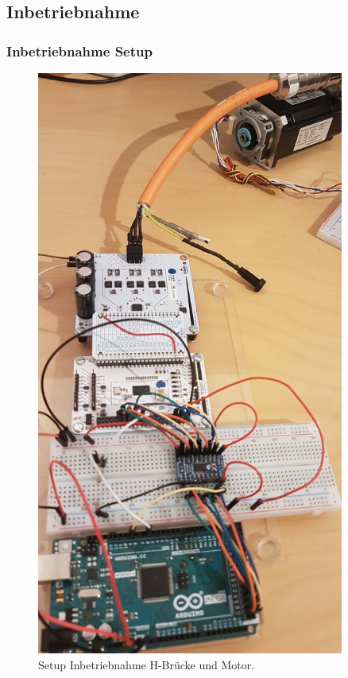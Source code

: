 \begin{appendix}
\subsection{Inbetriebnahme}

\subsubsection{Inbetriebnahme Setup}\label{Appendix:H_Bruecke_Setup}

\begin{figure}[h!]
	\centering
	\includegraphics[angle =270, width=0.9\textwidth]{graphics/3_normal}
	\caption{Setup Inbetriebnahme H-Brücke und Motor.}
	\label{fig:3_normal}
\end{figure}


\end{appendix}
